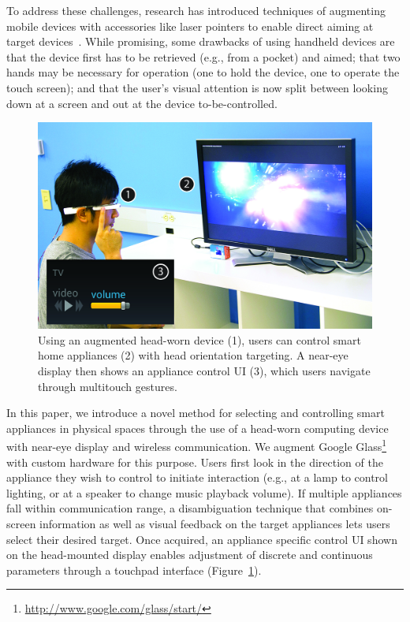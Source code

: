 \documentclass{sigchi}
\begin{document}
To address these challenges, research has introduced techniques of augmenting mobile devices with accessories like laser pointers to enable direct aiming at target devices~\cite{beigl_point_1999,patel_2-way_2003}. While promising, some drawbacks of using handheld devices are that the device first has to be retrieved (e.g., from a pocket) and aimed; that two hands may be necessary for operation (one to hold the device, one to operate the touch screen); and that the user's visual attention is now split between looking down at a screen and out at the device to-be-controlled. 

\begin{figure}[t]
\centering
\includegraphics[width=1.0\columnwidth]{figures/teaser.jpg}
\caption{Using an augmented head-worn device (1), users can control smart home appliances (2) with head orientation targeting. A near-eye display then shows an appliance control UI (3), which users navigate through multitouch gestures.}
\label{fig:teaser}
\end{figure}

In this paper, we introduce a novel method for selecting and controlling smart appliances in physical spaces through the use of a head-worn computing device with near-eye display and wireless communication. We augment Google Glass\footnote{\url{http://www.google.com/glass/start/}} with custom hardware for this purpose. Users first look in the direction of the appliance they wish to control to initiate interaction (e.g., at a lamp to control lighting, or at a speaker to change music playback volume).  If multiple appliances fall within communication range, a disambiguation technique that combines on-screen information as well as visual feedback on the target appliances lets users select their desired target. Once acquired, an appliance specific control UI shown on the head-mounted display enables adjustment of discrete and continuous parameters through a touchpad interface (Figure~\ref{fig:teaser}).
\end{document}
